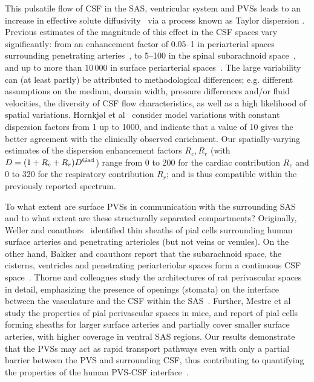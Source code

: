 \documentclass[fleqn,10pt]{wlscirep}
\begin{document}
This pulsatile flow of CSF in the SAS, ventricular system and PVSs
leads to an increase in effective solute
diffusivity~\cite{stockman2007effect, hettiarachchi2011effect,
  asgari2016glymphatic, sharp2019dispersion, ray2021quantitative} via
a process known as Taylor dispersion \cite{taylor1953dispersion,
  watson1983diffusion}. Previous estimates of the magnitude of this
effect in the CSF spaces vary significantly: from an enhancement
factor of 0.05--1 in periarterial spaces surrounding penetrating
arteries~\cite{asgari2016glymphatic, troyetsky2021dispersion}, to
5--100 in the spinal subarachnoid space~\cite{stockman2007effect,
  hettiarachchi2011effect, sharp2019dispersion}, and up to more than
$10\,000$ in surface periarterial spaces~\cite{ray2021quantitative,
  sharp2019dispersion}. The large variability can (at least partly) be
attributed to methodological differences; e.g. different assumptions
on the medium, domain width, pressure differences and/or fluid
velocities, the diversity of CSF flow characteristics, as well as a
high likelihood of spatial variations. Hornkjøl et
al~\cite{hornkjol2022csf} consider model variations with constant
dispersion factors from 1 up to 1000, and indicate that a value of 10
gives the better agreement with the clinically observed
enrichment. Our spatially-varying estimates of the dispersion
enhancement factors $R_c, R_r$ (with $D = (1 + R_c + R_r) D^{\rm
  Gad}$) range from 0 to 200 for the cardiac contribution $R_c$ and 0
to 320 for the respiratory contribution $R_r$; and is thus compatible
within the previously reported spectrum.

To what extent are surface PVSs in communication with the surrounding
SAS and to what extent are these structurally separated compartments?
Originally, Weller and coauthors~\cite{zhang1990interrelationships,
  zhang1992directional, weller2005microscopic} identified thin sheaths
of pial cells surrounding human surface arteries and penetrating
arterioles (but not veins or venules). On the other hand, Bakker and
coauthors report that the subarachnoid space, the cisterns, ventricles
and penetrating periarteriolar spaces form a continuous CSF
space~\cite{bedussi2017paravascular}. Thorne and colleagues study the
architectures of rat perivascular spaces in detail, emphasizing the
presence of openings (stomata) on the interface between the
vasculature and the CSF within the SAS~\cite{pizzo2018intrathecal,
  hannocks2018molecular}. Further, Mestre et
al~\cite{mestre2022periarteriolar} study the properties of pial
perivascular spaces in mice, and report of pial cells forming sheaths
for larger surface arteries and partially cover smaller surface
arteries, with higher coverage in ventral SAS regions. Our results
demonstrate that the PVSs may act as rapid transport pathways even
with only a partial barrier between the PVS and surrounding CSF, thus
contributing to quantifying the properties of the human PVS-CSF
interface~\cite{eide2024functional}.
\end{document}
